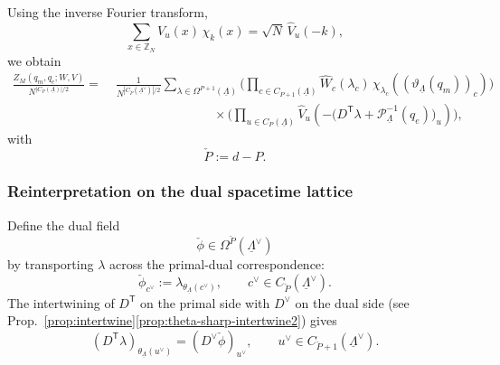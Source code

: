 \documentclass[dvipsnames,a4paper]{article}
\numberwithin{equation}{section}
\theoremstyle{definition}
\theoremstyle{remark}
\begin{document}
Using the inverse Fourier transform,
\begin{equation}
	\sum_{x\in \mathbb Z_N}V_u(x)\,\chi_k(x)
	=
	\sqrt N\,\widehat V_u(-k),
\end{equation}
we obtain
\begin{equation}
	\begin{aligned}
		\frac{Z_M(q_m,q_e;W,V)}{N^{|C_P(\underline\Lambda)|/2}}
		=&\;
		\frac{1}{N^{|C_{\check P}(\underline\Lambda^\vee)|/2}}
		\sum_{\lambda\in \Omega^{P+1}(\underline\Lambda)}
		\Biggl(
		\prod_{c\in C_{P+1}(\underline\Lambda)}
		\widehat W_c(\lambda_c)\,
		\chi_{\lambda_c} \left((\vartheta_{\underline\Lambda}(q_m))_c\right)
		\Biggr)
		\\
		& \hspace{8em} \times
		\Biggl(
		\prod_{u\in C_P(\underline\Lambda)}
		\widehat V_u \left(-\bigl(D^{\mathsf T}\lambda+\mathcal P_{\underline\Lambda}^{-1}(q_e)\bigr)_u\right)
		\Biggr),
	\end{aligned}
	\label{eq:KW-fixed-charge-primal-fourier}
\end{equation}
with
\begin{equation}
	\check P:=d-P. \label{eq:dualP}
\end{equation}

\subsubsection{Reinterpretation on the dual spacetime lattice}

Define the dual field
\begin{equation}
	\check\phi\in \Omega^{\check P}(\underline\Lambda^\vee)
\end{equation}
by transporting \(\lambda\) across the primal-dual correspondence:
\begin{equation}
	\check\phi_{c^\vee}
	:=
	\lambda_{\theta_{\underline\Lambda}(c^\vee)},
	\qquad
	c^\vee\in C_{\check P}(\underline\Lambda^\vee).
	\label{eq:KW-dual-field}
\end{equation}
The intertwining of \(D^{\mathsf T}\) on the primal side with \(D^\vee\) on the dual side
(see Prop.~\ref{prop:intertwine}\ref{prop:theta-sharp-intertwine2}) gives
\begin{equation}
	(D^{\mathsf T}\lambda)_{\theta_{\underline\Lambda}(u^\vee)}
	=
	(D^\vee \check\phi)_{u^\vee},
	\qquad
	u^\vee\in C_{\check P+1}(\underline\Lambda^\vee).
	\label{eq:KW-Dt-dual}
\end{equation}
\end{document}
